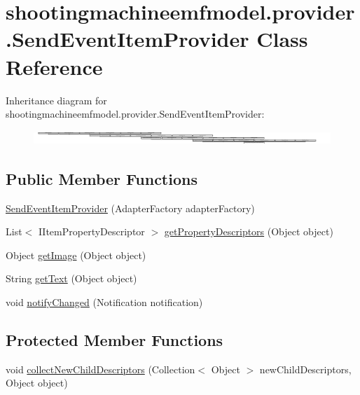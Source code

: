 \hypertarget{classshootingmachineemfmodel_1_1provider_1_1_send_event_item_provider}{\section{shootingmachineemfmodel.\-provider.\-Send\-Event\-Item\-Provider Class Reference}
\label{classshootingmachineemfmodel_1_1provider_1_1_send_event_item_provider}
}
Inheritance diagram for shootingmachineemfmodel.\-provider.\-Send\-Event\-Item\-Provider\-:\begin{figure}[H]
\begin{center}
\leavevmode
\includegraphics[height=0.534759cm]{classshootingmachineemfmodel_1_1provider_1_1_send_event_item_provider}
\end{center}
\end{figure}
\subsection*{Public Member Functions}
\begin{DoxyCompactItemize}
\item 
\hyperlink{classshootingmachineemfmodel_1_1provider_1_1_send_event_item_provider_aec6915f460940236b76d5a29d5aeada4}{Send\-Event\-Item\-Provider} (Adapter\-Factory adapter\-Factory)
\item 
List$<$ I\-Item\-Property\-Descriptor $>$ \hyperlink{classshootingmachineemfmodel_1_1provider_1_1_send_event_item_provider_aa6a905588554f22b51b84f2823427392}{get\-Property\-Descriptors} (Object object)
\item 
Object \hyperlink{classshootingmachineemfmodel_1_1provider_1_1_send_event_item_provider_aa79d8fecb68c0b67e39315d5c2999e82}{get\-Image} (Object object)
\item 
String \hyperlink{classshootingmachineemfmodel_1_1provider_1_1_send_event_item_provider_a9926f92fbd49cfe1c1f663c2397fd562}{get\-Text} (Object object)
\item 
void \hyperlink{classshootingmachineemfmodel_1_1provider_1_1_send_event_item_provider_a5e52223cbb0c2e5d6327633857ac94da}{notify\-Changed} (Notification notification)
\end{DoxyCompactItemize}
\subsection*{Protected Member Functions}
\begin{DoxyCompactItemize}
\item 
void \hyperlink{classshootingmachineemfmodel_1_1provider_1_1_send_event_item_provider_a464cfa2474875d582ff0c281f059bc41}{collect\-New\-Child\-Descriptors} (Collection$<$ Object $>$ new\-Child\-Descriptors, Object object)
\end{DoxyCompactItemize}


